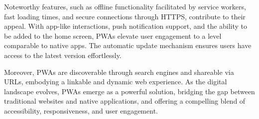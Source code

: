 \documentclass[12pt, a4paper, twoside]{article}
\begin{document}
Noteworthy features, such as offline functionality facilitated by service workers, fast loading times, and secure connections through HTTPS, contribute to their appeal. With app-like interactions, push notification support, and the ability to be added to the home screen, PWAs elevate user engagement to a level comparable to native apps. The automatic update mechanism ensures users have access to the latest version effortlessly. \vspace{1em}

Moreover, PWAs are discoverable through search engines and shareable via URLs, embodying a linkable and dynamic web experience. As the digital landscape evolves, PWAs emerge as a powerful solution, bridging the gap between traditional websites and native applications, and offering a compelling blend of accessibility, responsiveness, and user engagement.
\end{document}
